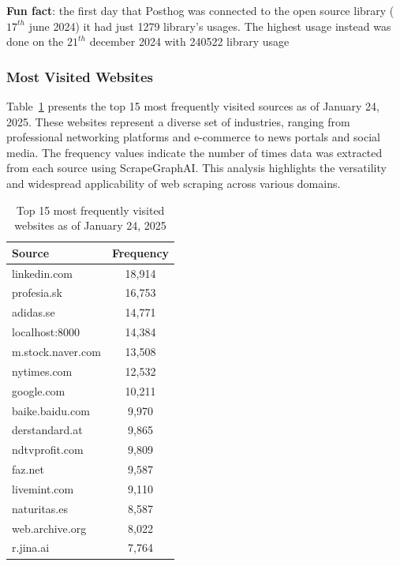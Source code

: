 \textbf{Fun fact}: the first day that Posthog was connected to the open source library ($17^{th}$ june 2024) it had just 1279 library's usages. The highest usage instead was done on the $21^{th}$ december 2024 with 240522 library usage

\subsubsection{Most Visited Websites}

Table~\ref{tab:most-visited-websites} presents the top 15 most frequently visited sources as of January 24, 2025. These websites represent a diverse set of industries, ranging from professional networking platforms and e-commerce to news portals and social media. The frequency values indicate the number of times data was extracted from each source using ScrapeGraphAI. This analysis highlights the versatility and widespread applicability of web scraping across various domains.

\begin{table}[h!]
\centering
\begin{tabular}{|l|c|}
\hline
\textbf{Source}              & \textbf{Frequency} \\ \hline
linkedin.com                 & 18,914             \\ \hline
profesia.sk                  & 16,753             \\ \hline
adidas.se                    & 14,771             \\ \hline
localhost:8000               & 14,384             \\ \hline
m.stock.naver.com            & 13,508             \\ \hline
nytimes.com                  & 12,532             \\ \hline
google.com                   & 10,211             \\ \hline
baike.baidu.com              & 9,970              \\ \hline
derstandard.at               & 9,865              \\ \hline
ndtvprofit.com               & 9,809              \\ \hline
faz.net                      & 9,587              \\ \hline
livemint.com                 & 9,110              \\ \hline
naturitas.es                 & 8,587              \\ \hline
web.archive.org              & 8,022              \\ \hline
r.jina.ai                    & 7,764              \\ \hline
\end{tabular}
\caption{Top 15 most frequently visited websites as of January 24, 2025}
\label{tab:most-visited-websites}
\end{table}

